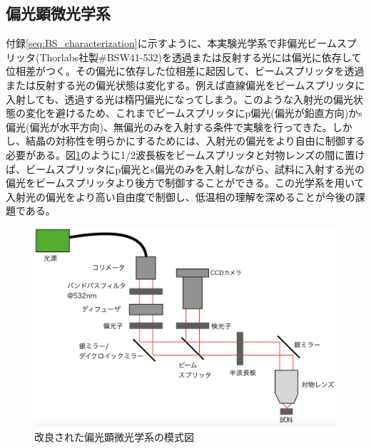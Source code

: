\subsection{偏光顕微光学系}
付録\ref{seq:BS_characterization}に示すように、本実験光学系で非偏光ビームスプリッタ(Thorlabs社製\#BSW41-532)を透過または反射する光には偏光に依存して位相差がつく。その偏光に依存した位相差に起因して、ビームスプリッタを透過または反射する光の偏光状態は変化する。例えば直線偏光をビームスプリッタに入射しても、透過する光は楕円偏光になってしまう。このような入射光の偏光状態の変化を避けるため、これまでビームスプリッタにp偏光(偏光が鉛直方向)かs偏光(偏光が水平方向)、無偏光のみを入射する条件で実験を行ってきた。しかし、結晶の対称性を明らかにするためには、入射光の偏光をより自由に制御する必要がある。図\ref{fig:microscope2}のように1/2波長板をビームスプリッタと対物レンズの間に置けば、ビームスプリッタにp偏光とs偏光のみを入射しながら、試料に入射する光の偏光をビームスプリッタより後方で制御することができる。この光学系を用いて入射光の偏光をより高い自由度で制御し、低温相の理解を深めることが今後の課題である。
\begin{figure}[htb]
  \begin{center}
   \includegraphics[width=120mm]{microscope2.eps}
  \end{center}
  \caption{改良された偏光顕微光学系の模式図}
  \label{fig:microscope2}
\end{figure}
